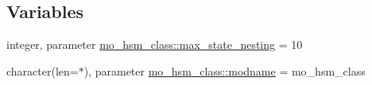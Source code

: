 \subsection*{Variables}
\begin{DoxyCompactItemize}
\item 
integer, parameter \hyperlink{namespacemo__hsm__class_a32995d2c8288f1be7f2ea26c26a24892}{mo\+\_\+hsm\+\_\+class\+::max\+\_\+state\+\_\+nesting} = 10
\item 
character(len=$\ast$), parameter \hyperlink{namespacemo__hsm__class_a0c94990aceda682db1c3282ff2d8c836}{mo\+\_\+hsm\+\_\+class\+::modname} = \textquotesingle{}mo\+\_\+hsm\+\_\+class\textquotesingle{}
\end{DoxyCompactItemize}

